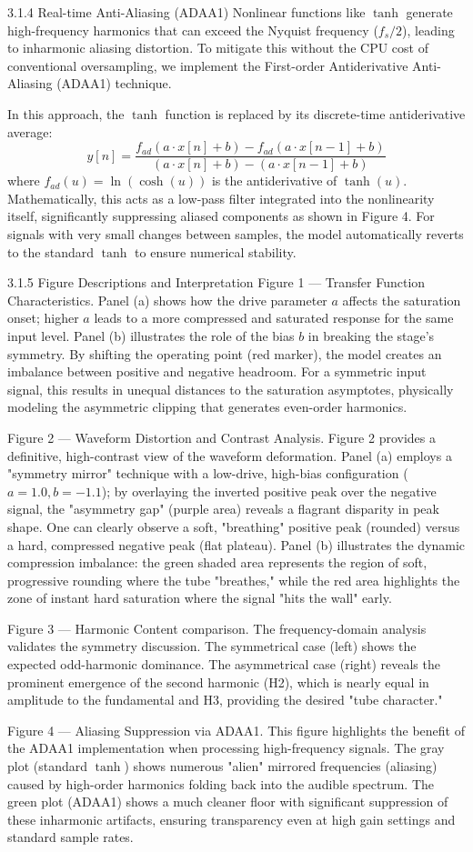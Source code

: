 3.1.4 Real-time Anti-Aliasing (ADAA1)
Nonlinear functions like $\tanh$ generate high-frequency harmonics that can exceed the Nyquist frequency ($f_s/2$), leading to inharmonic aliasing distortion. To mitigate this without the CPU cost of conventional oversampling, we implement the First-order Antiderivative Anti-Aliasing (ADAA1) technique.

In this approach, the $\tanh$ function is replaced by its discrete-time antiderivative average:
$$ y[n] = \frac{f_{ad}(a \cdot x[n] + b) - f_{ad}(a \cdot x[n-1] + b)}{(a \cdot x[n] + b) - (a \cdot x[n-1] + b)} \tag{11} $$
where $f_{ad}(u) = \ln(\cosh(u))$ is the antiderivative of $\tanh(u)$. Mathematically, this acts as a low-pass filter integrated into the nonlinearity itself, significantly suppressing aliased components as shown in Figure 4. For signals with very small changes between samples, the model automatically reverts to the standard $\tanh$ to ensure numerical stability.

3.1.5 Figure Descriptions and Interpretation
Figure 1 — Transfer Function Characteristics. Panel (a) shows how the drive parameter $a$ affects the saturation onset; higher $a$ leads to a more compressed and saturated response for the same input level. Panel (b) illustrates the role of the bias $b$ in breaking the stage's symmetry. By shifting the operating point (red marker), the model creates an imbalance between positive and negative headroom. For a symmetric input signal, this results in unequal distances to the saturation asymptotes, physically modeling the asymmetric clipping that generates even-order harmonics.

Figure 2 --- Waveform Distortion and Contrast Analysis. Figure 2 provides a definitive, high-contrast view of the waveform deformation. Panel (a) employs a "symmetry mirror" technique with a low-drive, high-bias configuration ($a=1.0, b=-1.1$); by overlaying the inverted positive peak over the negative signal, the "asymmetry gap" (purple area) reveals a flagrant disparity in peak shape. One can clearly observe a soft, "breathing" positive peak (rounded) versus a hard, compressed negative peak (flat plateau). Panel (b) illustrates the dynamic compression imbalance: the green shaded area represents the region of soft, progressive rounding where the tube "breathes," while the red area highlights the zone of instant hard saturation where the signal "hits the wall" early.

Figure 3 — Harmonic Content comparison. The frequency-domain analysis validates the symmetry discussion. The symmetrical case (left) shows the expected odd-harmonic dominance. The asymmetrical case (right) reveals the prominent emergence of the second harmonic (H2), which is nearly equal in amplitude to the fundamental and H3, providing the desired "tube character."

Figure 4 — Aliasing Suppression via ADAA1. This figure highlights the benefit of the ADAA1 implementation when processing high-frequency signals. The gray plot (standard $\tanh$) shows numerous "alien" mirrored frequencies (aliasing) caused by high-order harmonics folding back into the audible spectrum. The green plot (ADAA1) shows a much cleaner floor with significant suppression of these inharmonic artifacts, ensuring transparency even at high gain settings and standard sample rates.
